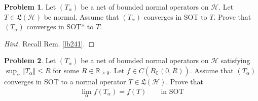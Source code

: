 \documentclass[12pt,b5paper,notitlepage]{article}
\theoremstyle{definition}
\newtheorem{prob}{\color{red}Problem}[section]
\theoremstyle{plain}
\newcommand{\fk}{\mathfrak}
\newcommand{\ovl}{\overline}
\newcommand{\Cbb}{\mathbb C}
\newcommand{\Rbb}{\mathbb R}
\newcommand{\MH}{\mathcal H}
\numberwithin{equation}{section}
\begin{document}
\begin{prob}
Let $(T_\alpha)$ be a net of bounded normal operators on $\MH$. Let $T\in\fk L(\MH)$ be normal. Assume that $(T_\alpha)$ converges in SOT to $T$. Prove that $(T_\alpha)$ converges in SOT* to $T$.
\end{prob}


\begin{proof}[Hint]
Recall Rem. \ref{lb241}.
\end{proof}


\begin{prob}\label{lb240}
Let $(T_\alpha)$ be a net of bounded normal operators on $\MH$ satisfying $\sup_\alpha\Vert T_\alpha\Vert\leq R$ for some $R\in\Rbb_{\geq0}$. Let $f\in C(\ovl B_\Cbb(0,R))$. Assume that $(T_\alpha)$ converges in SOT to a normal operator $T\in\fk L(\MH)$. Prove that
\begin{align}
\lim_\alpha f(T_\alpha)=f(T)\qquad\text{in SOT}
\end{align}
\end{prob}


\printindex	
\end{document}
